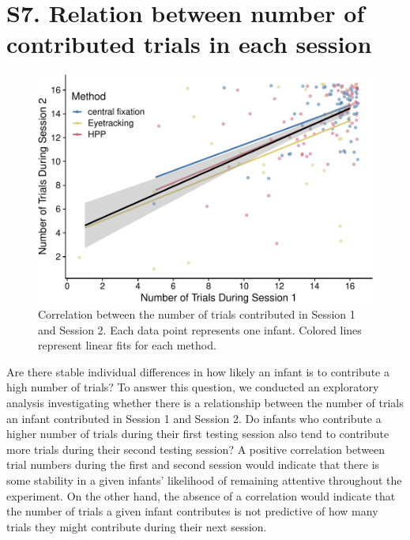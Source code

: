 \documentclass[
  man, donotrepeattitle,floatsintext]{apa6}
\begin{document}
\newpage

\hypertarget{s7.-relation-between-number-of-contributed-trials-in-each-session}{%
\section{S7. Relation between number of contributed trials in each session}\label{s7.-relation-between-number-of-contributed-trials-in-each-session}}

\begin{figure}
\centering
\includegraphics{MB1T_supplement_files/figure-latex/sfig7-1.pdf}
\caption{\label{fig:sfig7}Correlation between the number of trials contributed in Session 1 and Session 2. Each data point represents one infant. Colored lines represent linear fits for each method.}
\end{figure}

Are there stable individual differences in how likely an infant is to contribute a high number of trials?
To answer this question, we conducted an exploratory analysis investigating whether there is a relationship between the number of trials an infant contributed in Session 1 and Session 2.
Do infants who contribute a higher number of trials during their first testing session also tend to contribute more trials during their second testing session?
A positive correlation between trial numbers during the first and second session would indicate that there is some stability in a given infants' likelihood of remaining attentive throughout the experiment.
On the other hand, the absence of a correlation would indicate that the number of trials a given infant contributes is not predictive of how many trials they might contribute during their next session.
\end{document}
